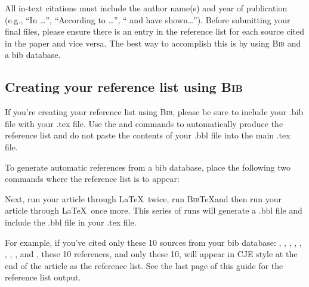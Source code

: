 \documentclass{cje}          %
\theoremstyle{plain}%
\theoremstyle{definition}
\theoremstyle{remark}
\begin{document}
All in-text citations must include the author name(s) and year of publication (e.g., ``In \cite{Lucas90}\ldots'',  ``According to \cite{Van-Zon}\ldots'', ``\cite{Mas-Colell} and \cite{Glomm92} have shown\ldots''). Before submitting your final files, please ensure there is an entry in the reference list for each source cited in the paper and vice versa. The best way to accomplish this is by using \textsc{Bib}\upshape{\TeX} and a bib database.

\subsection{Creating your reference list using \textsc{Bib}\upshape{\TeX}}

If you're creating your reference list using \textsc{Bib}\upshape{\TeX}, please be sure to include your .bib file with your .tex file. Use the \verb"" and \verb"" commands to automatically produce the reference list and do not paste the contents of your .bbl file into the main .tex file.

 To generate automatic references from a bib database, place the following two commands where the reference list is to appear:
\begin{smallverbatim}
\end{smallverbatim}
%
Next, run your article through \LaTeX\ twice, run \textsc{Bib}\TeX and then run your article through \LaTeX\ once more. This series of runs will generate a .bbl file and include the .bbl file in your .tex file.

For example, if you've cited only these 10 sources from your bib database: 
\cite{Glomm92},
\cite{Mas-Colell},
\cite{Atkinson},
\cite{Van-Zon},
\cite{vanderPolGairns2000},
\cite{Lucas90},
\cite{Mendoza1991}, 
\cite{Glomm97},
\cite{Aisa04} and
\cite{LiSK12}, 
these 10 references, and only these 10, will appear in CJE style at the end of the article as the reference list. See the last page of this guide for the reference list output.
\end{document}
